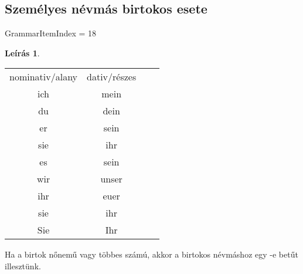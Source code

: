 \documentclass{article}
\theoremstyle{definition}
\newtheorem*{desc}{Leírás}
\begin{document}
\subsection{Személyes névmás birtokos esete}

GrammarItemIndex = 18

\begin{desc}
\begin{tabular}{cccc}
 nominativ/alany & dativ/részes \\
 ich & mein\\
 du & dein\\
 er & sein\\
 sie & ihr\\
 es & sein\\
 wir & unser\\
 ihr & euer\\
 sie & ihr\\
 Sie & Ihr\\
\end{tabular}

Ha a birtok nőnemű vagy többes számú, akkor a birtokos névmáshoz
egy -e betűt illesztünk.
\end{desc}
\end{document}
